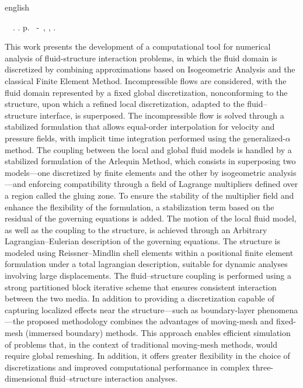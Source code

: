 \begin{resumo}[Abstract]
 \begin{otherlanguage*}{english}
	\begin{flushleft} 
		\setlength{\absparsep}{0pt} %
 		\SingleSpacing  		\imprimirautorabr~~\textbf{\imprimirtitleabstract}.	\imprimirdata.  \pageref{LastPage} p. 
		\imprimirtipotrabalhoabs~-~\imprimirinstituicao, \imprimirlocal, 	\imprimirdata. 
 	\end{flushleft}
	\OnehalfSpacing 
This work presents the development of a computational tool for numerical analysis of fluid-structure interaction problems, in which the fluid domain is discretized by combining approximations based on Isogeometric Analysis and the classical Finite Element Method. Incompressible flows are considered, with the fluid domain represented by a fixed global discretization, nonconforming to the structure, upon which a refined local discretization, adapted to the fluid–structure interface, is superposed. The incompressible flow is solved through a stabilized formulation that allows equal-order interpolation for velocity and pressure fields, with implicit time integration performed using the generalized-$\alpha$ method. The coupling between the local and global fluid models is handled by a stabilized formulation of the Arlequin Method, which consists in superposing two models—one discretized by finite elements and the other by isogeometric analysis—and enforcing compatibility through a field of Lagrange multipliers defined over a region called the gluing zone. To ensure the stability of the multiplier field and enhance the flexibility of the formulation, a stabilization term based on the residual of the governing equations is added. The motion of the local fluid model, as well as the coupling to the structure, is achieved through an Arbitrary Lagrangian–Eulerian description of the governing equations. The structure is modeled using Reissner–Mindlin shell elements within a positional finite element formulation under a total lagrangian description, suitable for dynamic analyses involving large displacements. The fluid–structure coupling is performed using a strong partitioned block iterative scheme that ensures consistent interaction between the two media. In addition to providing a discretization capable of capturing localized effects near the structure—such as boundary-layer phenomena—the proposed methodology combines the advantages of moving-mesh and fixed-mesh (immersed boundary) methods. This approach enables efficient simulation of problems that, in the context of traditional moving-mesh methods, would require global remeshing. In addition, it offers greater flexibility in the choice of discretizations and improved computational performance in complex three-dimensional fluid–structure interaction analyses.


\end{otherlanguage*}
\end{resumo}

